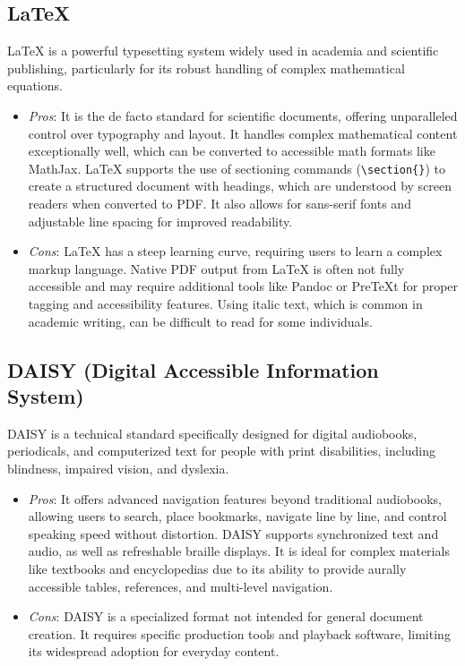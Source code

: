 \subsection{LaTeX}
LaTeX is a powerful typesetting system widely used in academia and scientific publishing, particularly for its robust handling of complex mathematical equations. \supercite{CreateUW}
\begin{itemize}
	\item \emph{Pros}: It is the de facto standard for scientific documents, offering unparalleled control over typography and layout. It handles complex mathematical content exceptionally well, which can be converted to accessible math formats like MathJax. \supercite{CreateUW, LaTeXAccessibility} LaTeX supports the use of sectioning commands (\texttt{\textbackslash section\{\}}) to create a structured document with headings, which are understood by screen readers when converted to PDF. \supercite{LancasterLatex} It also allows for sans-serif fonts and adjustable line spacing for improved readability. \supercite{LancasterLatex}
	\item \emph{Cons}: LaTeX has a steep learning curve, requiring users to learn a complex markup language. Native PDF output from LaTeX is often not fully accessible and may require additional tools like Pandoc or PreTeXt for proper tagging and accessibility features. \supercite{CreateUW, LaTeXAccessibility} Using italic text, which is common in academic writing, can be difficult to read for some individuals. \supercite{LancasterLatex}
\end{itemize}

\subsection{DAISY (Digital Accessible Information System)}
DAISY is a technical standard specifically designed for digital audiobooks, periodicals, and computerized text for people with print disabilities, including blindness, impaired vision, and dyslexia. \supercite{DAISYWiki}
\begin{itemize}
	\item \emph{Pros}: It offers advanced navigation features beyond traditional audiobooks, allowing users to search, place bookmarks, navigate line by line, and control speaking speed without distortion. \supercite{DAISYWiki, SnowDAISY} DAISY supports synchronized text and audio, as well as refreshable braille displays. \supercite{DAISYWiki, SnowDAISY} It is ideal for complex materials like textbooks and encyclopedias due to its ability to provide aurally accessible tables, references, and multi-level navigation. \supercite{DAISYWiki}
	\item \emph{Cons}: DAISY is a specialized format not intended for general document creation. It requires specific production tools and playback software, limiting its widespread adoption for everyday content. \supercite{DAISYWiki, SnowDAISY}
\end{itemize}

